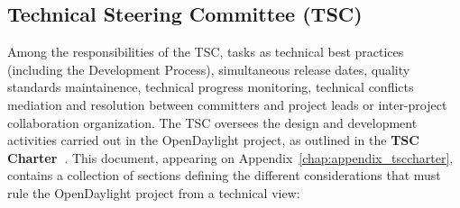 \documentclass[a4paper, 12pt]{book}
\begin{document}
\subsection{Technical Steering Committee (TSC)}
Among the responsibilities of the TSC, tasks as technical best practices (including the Development Process), simultaneous release dates, quality standards maintainence, technical progress monitoring, technical conflicts mediation and resolution between committers and project leads or inter-project collaboration organization. The TSC oversees the design and development activities carried out in the OpenDaylight project, as outlined in the \textbf{TSC Charter~\cite{OpenDaylightTSCCharter}}. This document, appearing on Appendix~\ref{chap:appendix_tsccharter}, contains a collection of sections defining the different considerations that must rule the OpenDaylight project from a technical view:
\end{document}
